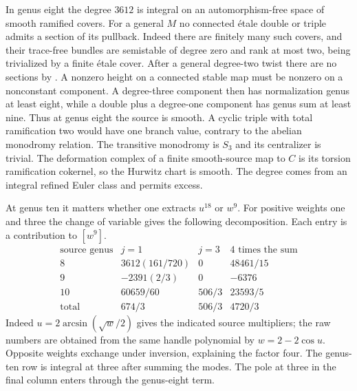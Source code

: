 In genus eight the degree $3612$ is integral on an automorphism-free
space of smooth ramified covers. For a general $M$ no connected
\'etale double or triple admits a section of its pullback. Indeed
there are finitely many such covers, and their trace-free bundles
are semistable of degree zero and rank at most two, being trivialized
by a finite \'etale cover. After a general degree-two twist there
are no sections by \cite[Proposition~1.6.2]{Raynaud}. A nonzero
height on a connected stable map must be nonzero on a nonconstant
component. A degree-three component then has normalization genus
at least eight, while a double plus a degree-one component has genus
sum at least nine. Thus at genus eight the source is smooth.
A cyclic triple with total ramification two would have one branch
value, contrary to the abelian monodromy relation. The transitive
monodromy is $S_3$ and its centralizer is trivial. The deformation
complex of a finite smooth-source map to $C$ is its torsion
ramification cokernel, so the Hurwitz chart is smooth. The degree
comes from an integral refined Euler class and permits excess.

At genus ten it matters whether one extracts $u^{18}$ or $w^9$.
For positive weights one and three the change of variable gives the
following decomposition. Each entry is a contribution to $[w^9]$.
\[
\begin{array}{c|rrr}
 \text{source genus}&j=1&j=3&4\text{ times the sum}\\ \hline
 8&3612(161/720)&0&48461/15\\
 9&-2391(2/3)&0&-6376\\
 10&60659/60&506/3&23593/5\\ \hline
 \text{total}&674/3&506/3&4720/3
\end{array}
\]
Indeed $u=2\arcsin(\sqrt{w}/2)$ gives the indicated source multipliers;
the raw numbers are obtained from the same handle polynomial by
$w=2-2\cos u$. Opposite weights exchange under inversion, explaining
the factor four. The genus-ten row is integral at three after summing
the modes. The pole at three in the final column enters through
the genus-eight term.

